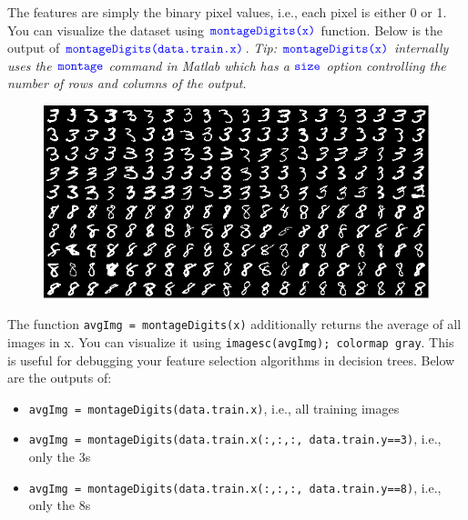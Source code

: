 \documentclass[10pt,letterpaper]{article}
\newcommand{\cmd}[1] {{\color{blue}\texttt{#1}}}
\begin{document}
The features are simply the binary pixel values, i.e., each pixel is either 0 or 1. You can visualize the dataset using $\cmd{montageDigits(x)}$ function. Below is the output of $\cmd{montageDigits(data.train.x)}$. \textit{Tip: $\cmd{montageDigits(x)}$ internally uses the $\cmd{montage}$ command in Matlab which has a $\cmd{size}$ option controlling the number of rows and columns of the output.}

\begin{figure}[h]
\centering
\includegraphics[width=0.85\linewidth]{training-examples.png}
\end{figure}

The function \cmd{avgImg = montageDigits(x)} additionally returns the average of all images in x. You can visualize it using \cmd{imagesc(avgImg); colormap gray}. This is useful for debugging your feature selection algorithms in decision trees. Below are the outputs of: 
\begin{itemize}
\item \cmd{avgImg = montageDigits(data.train.x)}, i.e., all training images
\item \cmd{avgImg = montageDigits(data.train.x(:,:,:, data.train.y==3)}, i.e., only the 3s
\item \cmd{avgImg = montageDigits(data.train.x(:,:,:, data.train.y==8)}, i.e., only the 8s
\end{itemize}
\end{document}
